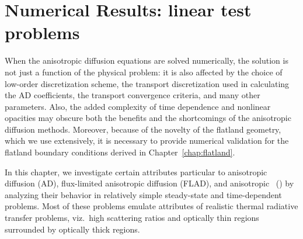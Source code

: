 
\chapter{Numerical Results: linear test problems}\label{chap:simpleNumericalResults}

When the anisotropic diffusion equations are solved numerically, the solution
is not just a function of the physical problem: it is also affected by the
choice
of low-order discretization scheme, the transport discretization used in
calculating the AD coefficients, the transport convergence criteria, and many
other parameters. Also, the added complexity of time dependence and
nonlinear opacities may obscure both the benefits and the shortcomings of the
anisotropic diffusion methods. Moreover, because of the novelty of the
flatland geometry, which we use extensively, it is necessary to provide
numerical validation for the flatland boundary conditions derived in
Chapter~\ref{chap:flatland}.

In this chapter, we investigate certain attributes particular to
anisotropic diffusion (AD), flux-limited anisotropic diffusion (FLAD), and
anisotropic \Pone\ (\APone) by analyzing their behavior in relatively simple
steady-state
and time-dependent problems. Most of these problems emulate attributes of
realistic thermal radiative transfer problems, viz.~high scattering ratios and
optically thin regions surrounded by optically thick regions.

